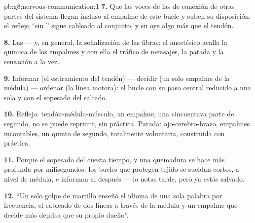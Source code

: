 \begin{solution}{pb:g8:nervous-communication:1}
\textbf{7.} Que las voces de las  de conexión de otras partes
del sistema llegan incluso al empalme de este bucle y suben su
disposición: el reflejo ``sin '' sigue cableado al conjunto, y su
 oye algo más que el tendón.

\textbf{8.} Las  --- y, en general, la señalización de las
fibras: el anestésico acalla la química de los empalmes y con ella el
tráfico de mensajes, la patada y la sensación a la vez.

\textbf{9.} Informar (el estiramiento del tendón) --- decidir (un solo
empalme de la médula) --- ordenar (la línea motora): el bucle con su
paso central reducido a una sola  y con el sopesado del 
saltado.

\textbf{10.} Reflejo: tendón-médula-músculo, un empalme, una
cincuentava parte de segundo, no se puede reprimir, sin práctica.
Parada: ojo-cerebro-brazo, empalmes incontables, un quinto de segundo,
totalmente voluntaria, construida con práctica.

\textbf{11.} Porque el sopesado del  cuesta tiempo, y una
quemadura se hace más profunda por milisegundos: los bucles que
protegen tejido se sueldan cortos, a nivel de médula, e informan al
 después --- lo notas tarde, pero ya estás salvado.

\textbf{12.} ``Un solo golpe de martillo enseñó el idioma de una sola
palabra por frecuencia, el cableado de dos líneas a través de la médula
y un empalme que decide más deprisa que su propio dueño''.
\end{solution}

